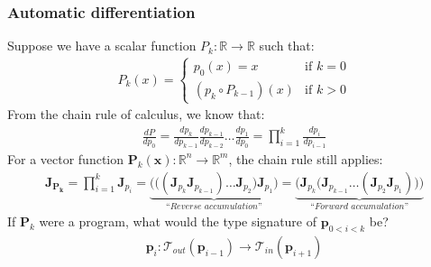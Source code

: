 \documentclass{beamer}
\begin{document}
    \begin{frame}
        \frametitle{Automatic differentiation}
        Suppose we have a scalar function $P_k: \mathbb{R}\rightarrow\mathbb{R}$ such that:
        \begin{align*}
            P_k(x) = \begin{cases} p_0(x) = x &\text{if } k=0\\ (p_k\circ P_{k-1})(x)&\text{if } k > 0 \end{cases}
        \end{align*}
        From the chain rule of calculus, we know that:
        \begin{align*}
            \frac{dP}{dp_0} = \frac{dp_k}{dp_{k-1}}\frac{dp_{k-1}}{dp_{k-2}}\dots\frac{dp_1}{dp_0}= {\displaystyle \prod_{i=1}^{k} \frac{dp_{i}}{dp_{i-1}}}
        \end{align*}
        For a vector function $\mathbf{P}_k(\mathbf{x}): \mathbb{R}^n\rightarrow\mathbb{R}^m$, the chain rule still applies:
        \begin{align*}
            \mathbf{J}_\mathbf{P_k} = \displaystyle \prod_{i=1}^{k} \mathbf{J}_{p_i} = \underbrace{\bigg(\Big((\mathbf{J}_{p_k} \mathbf{J}_{p_{k-1}}) \dots \mathbf{J}_{p_2}\Big) \mathbf{J}_{p_1}\bigg)}_{\textit{``Reverse accumulation''}} = \underbrace{\bigg(\mathbf{J}_{p_k} \Big(\mathbf{J}_{p_{k-1}} \dots (\mathbf{J}_{p_2} \mathbf{J}_{p_1})\Big)\bigg)}_{\textit{``Forward accumulation''}}
        \end{align*}
        If $\mathbf{P}_{k}$ were a program, what would the type signature of $\mathbf{p}_{0<i<k}$ be?
        \begin{align*}
            \mathbf{p}_i: \mathcal{T}_{out}(\mathbf{p}_{i-1}) \rightarrow \mathcal{T}_{in}(\mathbf{p}_{i+1})
        \end{align*}
    \end{frame}

\end{document}
